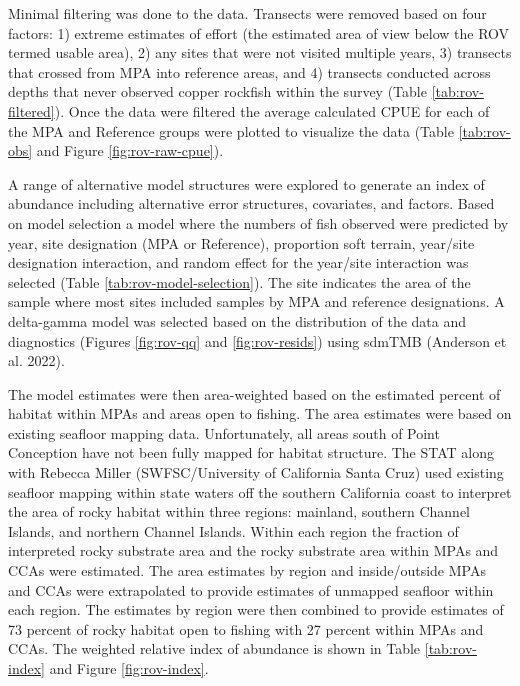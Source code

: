 \documentclass[11pt,
  english,
  letterpaper,
]{article}
\begin{document}
Minimal filtering was done to the data. Transects were removed based on four factors: 1) extreme estimates of effort (the estimated area of view below the ROV termed usable area), 2) any sites that were not visited multiple years, 3) transects that crossed from MPA into reference areas, and 4) transects conducted across depths that never observed copper rockfish within the survey (Table \ref{tab:rov-filtered}). Once the data were filtered the average calculated CPUE for each of the MPA and Reference groups were plotted to visualize the data (Table \ref{tab:rov-obs} and Figure \ref{fig:rov-raw-cpue}).

A range of alternative model structures were explored to generate an index of abundance including alternative error structures, covariates, and factors. Based on model selection a model where the numbers of fish observed were predicted by year, site designation (MPA or Reference), proportion soft terrain, year/site designation interaction, and random effect for the year/site interaction was selected (Table \ref{tab:rov-model-selection}). The site indicates the area of the sample where most sites included samples by MPA and reference designations. A delta-gamma model was selected based on the distribution of the data and diagnostics (Figures \ref{fig:rov-qq} and \ref{fig:rov-resids}) using sdmTMB (Anderson et al. 2022).

The model estimates were then area-weighted based on the estimated percent of habitat within MPAs and areas open to fishing. The area estimates were based on existing seafloor mapping data. Unfortunately, all areas south of Point Conception have not been fully mapped for habitat structure. The STAT along with Rebecca Miller (SWFSC/University of California Santa Cruz) used existing seafloor mapping within state waters off the southern California coast to interpret the area of rocky habitat within three regions: mainland, southern Channel Islands, and northern Channel Islands. Within each region the fraction of interpreted rocky substrate area and the rocky substrate area within MPAs and CCAs were estimated. The area estimates by region and inside/outside MPAs and CCAs were extrapolated to provide estimates of unmapped seafloor within each region. The estimates by region were then combined to provide estimates of 73 percent of rocky habitat open to fishing with 27 percent within MPAs and CCAs. The weighted relative index of abundance is shown in Table \ref{tab:rov-index} and Figure \ref{fig:rov-index}.
\end{document}

